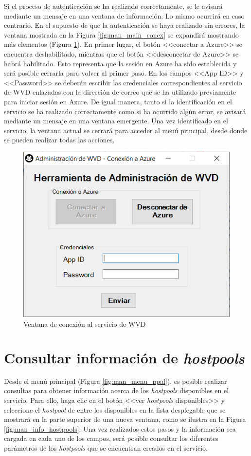 Si el proceso de autenticación se ha realizado correctamente, se le avisará mediante un mensaje en una ventana de información. Lo mismo ocurrirá en caso contrario. En el supuesto de que la autenticación se haya realizado sin errores, la ventana mostrada en la Figura \ref{fig:man_main_conex} se expandirá mostrando más elementos (Figura \ref{fig:man_main_expand}). En primer lugar, el botón <<conectar a Azure>> se encuentra deshabilitado, mientras que el botón <<desconectar de Azure>> se habrá habilitado. Esto representa que la sesión en Azure ha sido establecida y será posible cerrarla para volver al primer paso. En los campos <<App ID>> y <<Password>> se deberán escribir las credenciales correspondientes al servicio de \acs{WVD} enlazadas con la dirección de correo que se ha utilizado previamente para iniciar sesión en Azure. De igual manera, tanto si la identificación en el servicio se ha realizado correctamente como si ha ocurrido algún error, se avisará mediante un mensaje en una ventana emergente. Una vez identificado en el servicio, la ventana actual se cerrará para acceder al menú principal, desde donde se pueden realizar todas las acciones.

\begin{figure}[h]
  \centering
  \includegraphics[width=0.5\linewidth]{figures/images/script/main_expand.PNG}
  \caption{Ventana de conexión al servicio de \acs{WVD}}
  \label{fig:man_main_expand}
\end{figure}

\section{Consultar información de \textit{hostpools}}
Desde el menú principal (Figura \ref{fig:man_menu_ppal}), es posible realizar consultas para obtener información acerca de los \textit{hostpools} disponibles en el servicio. Para ello, haga clic en el botón <<ver \textit{hostpools} disponibles>> y seleccione el \textit{hostpool} de entre los disponibles en la lista desplegable que se mostrará en la parte superior de una nueva ventana, como se ilustra en la Figura \ref{fig:man_info_hostpools}. Una vez realizados estos pasos y la información sea cargada en cada uno de los campos, será posible consultar los diferentes parámetros de los \textit{hostpools} que se encuentran creados en el servicio.

